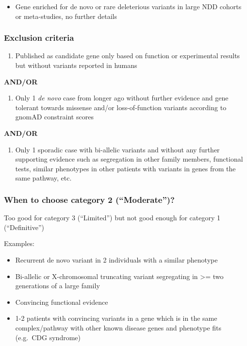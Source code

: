 \documentclass[
]{article}
\providecommand{\tightlist}{%
  \setlength{\itemsep}{0pt}\setlength{\parskip}{0pt}}
\begin{document}
\begin{itemize}
\tightlist
\item
  Gene enriched for de novo or rare deleterious variants in large NDD cohorts or meta-studies, no further details
\end{itemize}

\hypertarget{exclusion-criteria}{%
\subsubsection{Exclusion criteria}\label{exclusion-criteria}}

\begin{enumerate}
\def\labelenumi{\arabic{enumi}.}
\tightlist
\item
  Published as candidate gene only based on function or experimental results but without variants reported in humans
\end{enumerate}

\textbf{AND/OR}

\begin{enumerate}
\def\labelenumi{\arabic{enumi}.}
\setcounter{enumi}{1}
\tightlist
\item
  Only 1 \emph{de novo} case from longer ago without further evidence and gene tolerant towards missense and/or loss-of-function variants according to gnomAD constraint scores
\end{enumerate}

\textbf{AND/OR}

\begin{enumerate}
\def\labelenumi{\arabic{enumi}.}
\setcounter{enumi}{2}
\tightlist
\item
  Only 1 sporadic case with bi-allelic variants and without any further supporting evidence such as segregation in other family members, functional tests, similar phenotypes in other patients with variants in genes from the same pathway, etc.
\end{enumerate}

\hypertarget{when-to-choose-category-2-moderate}{%
\subsubsection{When to choose category 2 (``Moderate'')?}\label{when-to-choose-category-2-moderate}}

Too good for category 3 (``Limited'') but not good enough for category 1 (``Definitive'')

Examples:

\begin{itemize}
\item
  Recurrent de novo variant in 2 individuals with a similar phenotype
\item
  Bi-allelic or X-chromosomal truncating variant segregating in \textgreater= two generations of a large family
\item
  Convincing functional evidence
\item
  1-2 patients with convincing variants in a gene which is in the same complex/pathway with other known disease genes and phenotype fits (e.g.~CDG syndrome)
\end{itemize}
\end{document}

